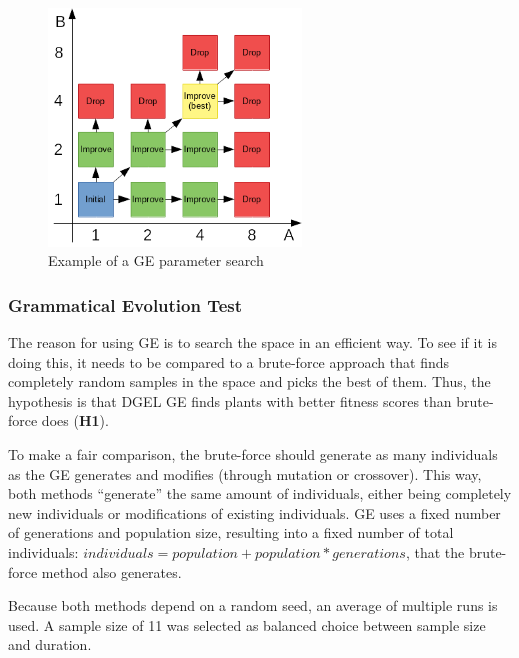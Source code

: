 \begin{figure}
    \centering
    \includegraphics[width=0.6\textwidth]{figures/parameter-search}
    \caption[Example of a GE parameter search]{Example of a \gls{GE} parameter search}
    \label{fig:parameter-search}
\end{figure}

\subsubsection{Grammatical Evolution Test}
\label{sec:ge-test-meth}
The reason for using \gls{GE} is to search the space in an efficient way.
To see if it is doing this, it needs to be compared to a brute-force approach that finds completely random samples in the space and picks the best of them.
Thus, the hypothesis is that \gls{DGEL} \gls{GE} finds plants with better fitness scores than brute-force does (\textbf{H1}).

To make a fair comparison, the brute-force should generate as many individuals as the \gls{GE} generates and modifies (through mutation or crossover).
This way, both methods ``generate'' the same amount of individuals, either being completely new individuals or modifications of existing individuals.
\gls{GE} uses a fixed number of generations and population size, resulting into a fixed number of total individuals: $individuals = population + population * generations$, that the brute-force method also generates.

Because both methods depend on a random seed, an average of multiple runs is used.
A sample size of 11 was selected as balanced choice between sample size and duration.

